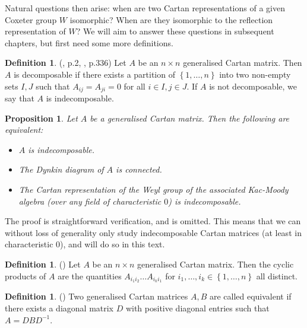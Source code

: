 \documentclass[11pt,a4paper]{report}
\newtheorem{proposition}[theorem]{Proposition}
\theoremstyle{definition}
\newtheorem{definition}[theorem]{Definition}
\begin{document}
Natural questions then arise: when are two Cartan representations of a given Coxeter group $W$ isomorphic? When are they isomorphic to the reflection representation of $W$? We will aim to answer these questions in subsequent chapters, but first need some more definitions. 

\begin{definition} (\cite{Kac}, p.2, \cite{Carter}, p.336) Let $A$ be an $n \times n$ generalised Cartan matrix. Then $A$ is decomposable if there exists a partition of $\left\{1, \ldots, n\right\}$ into two non-empty sets $I, J$ such that $A_{ij} = A_{ji} = 0$ for all $i \in I, j \in J$. If $A$ is not decomposable, we say that $A$ is indecomposable.\end{definition}

\begin{proposition} \label{prop:indecompcond} Let $A$ be a generalised Cartan matrix. Then the following are equivalent:

\begin{itemize}
    
\item $A$ is indecomposable.

\item The Dynkin diagram of $A$ is connected.

\item The Cartan representation of the Weyl group of the associated Kac-Moody algebra (over any field of characteristic $0$) is indecomposable. 
\end{itemize}
\end{proposition}
The proof is straightforward verification, and is omitted. This means that we can without loss of generality only study indecomposable Cartan matrices (at least in characteristic $0$), and will do so in this text. 

\begin{definition} (\cite{Vinberg}) Let $A$ be an $n \times n$ generalised Cartan matrix. Then the cyclic products of $A$ are the quantities $A_{i_1 i_2} \ldots A_{i_k i_1}$ for $i_1, \ldots, i_k \in \left\{1,\ldots,n\right\}$ all distinct.\end{definition}

\begin{definition} (\cite{Vinberg}) Two generalised Cartan matrices $A, B$ are called equivalent if there exists a diagonal matrix $D$ with positive diagonal entries such that $A = DBD^{-1}$.\end{definition}
\end{document}
